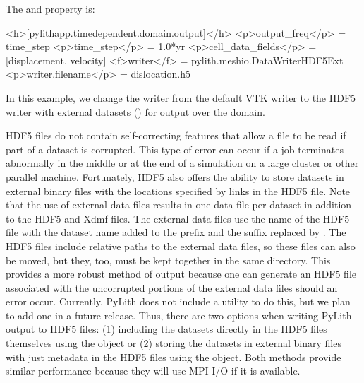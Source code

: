 \begin{inventory}
The  and  property is:
\begin{inventory}
\end{inventory}

\begin{cfg}
<h>[pylithapp.timedependent.domain.output]</h>
<p>output_freq</p> = time_step
<p>time_step</p> = 1.0*yr
<p>cell_data_fields</p> = [displacement, velocity]
<f>writer</f> = pylith.meshio.DataWriterHDF5Ext
<p>writer.filename</p> = dislocation.h5
\end{cfg}
In this example, we change the writer from the default VTK writer to
the HDF5 writer with external datasets ()
for output over the domain.

HDF5 files do not contain self-correcting features that allow a file
to be read if part of a dataset is corrupted. This type of error can
occur if a job terminates abnormally in the middle or at the end of a
simulation on a large cluster or other parallel machine. Fortunately,
HDF5 also offers the ability to store datasets in external binary
files with the locations specified by links in the HDF5 file. Note
that the use of external data files results in one data file per
dataset in addition to the HDF5 and Xdmf files. The external data
files use the name of the HDF5 file with the dataset name added to the
prefix and the  suffix replaced by . The
HDF5 files include relative paths to the external data files, so these
files can also be moved, but they, too, must be kept together in the
same directory. This provides a more robust method of output because
one can generate an HDF5 file associated with the uncorrupted portions
of the external data files should an error occur. Currently, PyLith
does not include a utility to do this, but we plan to add one in a
future release. Thus, there are two options when writing PyLith output
to HDF5 files: (1) including the datasets directly in the HDF5 files
themselves using the  object or (2) storing the
datasets in external binary files with just metadata in the HDF5 files
using the  object. Both methods provide
similar performance because they will use MPI I/O if it is available.



\end{inventory}
